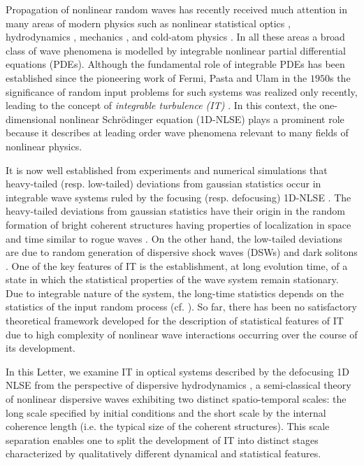 \documentclass[twocolumn,preprintnumbers,amsmath,amssymb,superscriptaddress]{revtex4}
\begin{document}
Propagation of nonlinear random waves has recently received much
attention  in many areas of modern physics such as nonlinear
statistical optics \cite{Picozzi:14,Laurie:12,Turitsyna:13,Pierangeli:16},
hydrodynamics \cite{Herbert:10}, mechanics \cite{Miquel:13},  and
cold-atom physics \cite{Navon:16}.  In all these areas a broad class of wave phenomena
is modelled by integrable  nonlinear partial differential equations (PDEs).  Although the fundamental role of
integrable PDEs has been established since the pioneering work of
Fermi, Pasta and Ulam in the $1950$s \cite{FPU:55}  the significance
of random input problems for such systems was realized only
recently,  leading to the concept of {\it integrable turbulence (IT)}
\cite{Zakharov:09,Agafontsev:15,Randoux:14,Walczak:15,Suret:16,Nahri:16,Randoux:16b,Zakharov:16,Agafontsev:16}.
In this context, the one-dimensional nonlinear Schr\"{o}dinger
equation (1D-NLSE) plays a prominent role because it describes at leading 
order wave phenomena relevant to many fields of nonlinear physics.  

It is now well established from experiments and numerical simulations
that  heavy-tailed (resp. low-tailed) deviations from gaussian
statistics occur in integrable wave systems  ruled by the focusing
(resp. defocusing)  1D-NLSE
\cite{Walczak:15,Suret:16,Randoux:14,Randoux:16b}.  The heavy-tailed
deviations from gaussian statistics have their origin in the random
formation  of bright coherent structures having properties of
localization in space and time  similar to rogue waves
\cite{Walczak:15,Suret:16,Onorato:13}. On the other hand, the
low-tailed deviations are due to  random generation of dispersive
shock waves (DSWs) and dark solitons \cite{Randoux:14,Randoux:16b}.
One of the key features of IT is the establishment, at long evolution
time, of a state in which the statistical properties of the wave
system remain stationary.  Due to integrable nature of the system, the
long-time statistics depends on the statistics of the input random
process (cf. \cite{Agafontsev:15,Randoux:14,
  Walczak:15,Randoux:16b}). So far, there has been no satisfactory
theoretical framework developed for the description of statistical
features of IT due to  high complexity of nonlinear wave interactions
occurring over the course of its development.

In this Letter, we examine IT in optical systems described by the
defocusing 1D NLSE from the perspective of dispersive hydrodynamics
\cite{Biondini:16}, a semi-classical theory of nonlinear dispersive
waves exhibiting two distinct spatio-temporal scales: the long scale
specified by initial conditions and the short scale by the internal
coherence length (i.e. the typical size of the  coherent structures).
This scale separation enables one to split the development of IT into
distinct stages characterized by qualitatively different
dynamical and statistical features.
\end{document}
